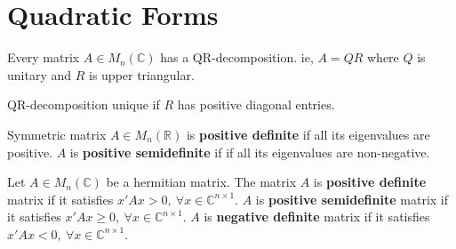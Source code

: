 \chapter{Quadratic Forms}
\begin{theorem}[QR decomposition]
	Every matrix $A \in M_n(\mathbb{C})$ has a QR-decomposition. ie, $A = QR$ where $Q$ is unitary and $R$ is upper triangular.
\end{theorem}
\begin{note}
	QR-decomposition unique if $R$ has positive diagonal entries.
\end{note}

\begin{definition}
	Symmetric matrix $A \in M_n(\mathbb{R})$ is \textbf{positive definite} if all its eigenvalues are positive.
	$A$ is \textbf{positive semidefinite} if if all its eigenvalues are non-negative.
\end{definition}

\begin{definition}
	Let $A \in M_n(\mathbb{C})$ be a hermitian matrix.
	The matrix $A$ is \textbf{positive definite} matrix if it satisfies $x'Ax > 0,\ \forall x \in \mathbb{C}^{n \times 1}$.
	$A$ is \textbf{positive semidefinite} matrix if it satisfies $x'Ax \ge  0,\ \forall x \in \mathbb{C}^{n \times 1}$.
	$A$ is \textbf{negative definite} matrix if it satisfies $x'Ax < 0,\ \forall x \in \mathbb{C}^{n \times 1}$.
\end{definition}
